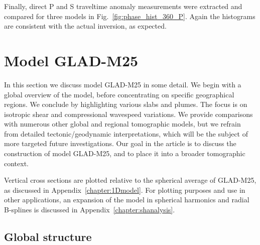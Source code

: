 Finally,
direct P and S traveltime anomaly measurements were extracted and compared for three models in Fig.~\ref{fig:phase_hist_360_P}.
Again the histograms are consistent with the actual inversion,
as expected.


\section{Model GLAD-M25}
\label{section:model}

In this section we discuss model GLAD-M25 in some detail.
We begin with a global overview of the model, before concentrating on
specific geographical regions.
We conclude by highlighting various slabs and plumes.
The focus is on isotropic shear and compressional wavespeed variations.
We provide comparisons with numerous other global and regional tomographic models,
but we refrain from detailed tectonic/geodynamic interpretations,
which will be the subject of more targeted future investigations.
Our goal in the article is to discuss the construction of model GLAD-M25,
and to place it into a broader tomographic context. 

Vertical cross sections are plotted relative to the spherical average of GLAD-M25,
as discussed in Appendix~\ref{chapter:1Dmodel}.
For plotting purposes and use in other applications,
an expansion of the model in spherical harmonics and radial B-splines is
discussed in Appendix~\ref{chapter:shanalysis}.

\subsection{Global structure}


